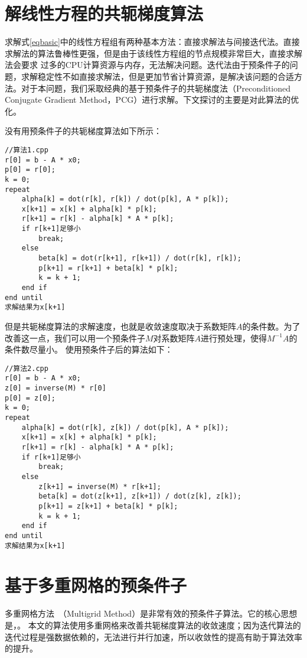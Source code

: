 \section{解线性方程的共轭梯度算法}

求解式\ref{eqbasic}中的线性方程组有两种基本方法：直接求解法与间接迭代法。直接求解法的算法鲁棒性更强，但是由于该线性方程组的节点规模非常巨大，直接求解法会要求
过多的CPU计算资源与内存，无法解决问题。迭代法由于预条件子的问题，求解稳定性不如直接求解法，但是更加节省计算资源，是解决该问题的合适方法。对于本问题，我们采取经典的基于预条件子的共轭梯度法（Preconditioned Conjugate Gradient Method，PCG）进行求解。下文探讨的主要是对此算法的优化。

没有用预条件子的共轭梯度算法如下所示：
\begin{lstlisting}
//算法1.cpp
r[0] = b - A * x0;
p[0] = r[0];
k = 0;
repeat
    alpha[k] = dot(r[k], r[k]) / dot(p[k], A * p[k]);
    x[k+1] = x[k] + alpha[k] * p[k];
    r[k+1] = r[k] - alpha[k] * A * p[k];
    if r[k+1]足够小
        break;
    else
        beta[k] = dot(r[k+1], r[k+1]) / dot(r[k], r[k]);
        p[k+1] = r[k+1] + beta[k] * p[k];
        k = k + 1;
    end if
end until
求解结果为x[k+1]
\end{lstlisting}

但是共轭梯度算法的求解速度，也就是收敛速度取决于系数矩阵$A$的条件数。为了改善这一点，我们可以用一个预条件子$M$对系数矩阵$A$进行预处理，使得$M^{-1}A$的条件数尽量小。
使用预条件子后的算法如下：
\begin{lstlisting}
//算法2.cpp
r[0] = b - A * x0;
z[0] = inverse(M) * r[0]
p[0] = z[0];
k = 0;
repeat
    alpha[k] = dot(r[k], z[k]) / dot(p[k], A * p[k]);
    x[k+1] = x[k] + alpha[k] * p[k];
    r[k+1] = r[k] - alpha[k] * A * p[k];
    if r[k+1]足够小
        break;
    else
        z[k+1] = inverse(M) * r[k+1];
        beta[k] = dot(z[k+1], z[k+1]) / dot(z[k], z[k]);
        p[k+1] = z[k+1] + beta[k] * p[k];
        k = k + 1;
    end if
end until
求解结果为x[k+1]
\end{lstlisting}

\section{基于多重网格的预条件子}

多重网格方法~\cite{trottenberg2000multigrid}（Multigrid Method）是非常有效的预条件子算法。它的核心思想是，。
本文的算法使用多重网格来改善共轭梯度算法的收敛速度；因为迭代算法的迭代过程是强数据依赖的，无法进行并行加速，所以收敛性的提高有助于算法效率的提升。

